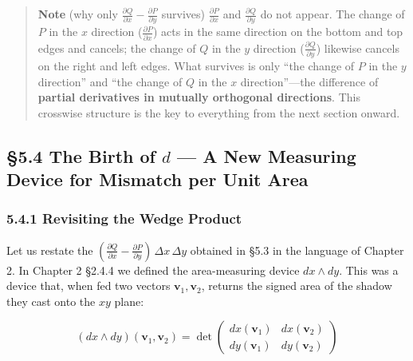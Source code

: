 \documentclass[a4paper,12pt,openany]{book}
\begin{document}
\begin{quote}
\textbf{Note} (why only
\(\frac{\partial Q}{\partial x}-\frac{\partial P}{\partial y}\)
survives) \(\frac{\partial P}{\partial x}\) and
\(\frac{\partial Q}{\partial y}\) do not appear. The change of \(P\) in
the \(x\) direction (\(\frac{\partial P}{\partial x}\)) acts in the same
direction on the bottom and top edges and cancels; the change of \(Q\)
in the \(y\) direction (\(\frac{\partial Q}{\partial y}\)) likewise
cancels on the right and left edges. What survives is only ``the change
of \(P\) in the \(y\) direction'' and ``the change of \(Q\) in the \(x\)
direction''—the difference of
\textbf{partial derivatives in mutually orthogonal directions}. This
crosswise structure is the key to everything from the next section
onward.
\end{quote}

\par\vspace{0.35em}\par

\hypertarget{the-birth-of-d-a-new-measuring-device-for-mismatch-per-unit-area}{%
\subsection{\texorpdfstring{§5.4 The Birth of \(d\) — A New Measuring
Device for Mismatch per Unit
Area}{§5.4 The Birth of d — A New Measuring Device for Mismatch per Unit Area}}\label{the-birth-of-d-a-new-measuring-device-for-mismatch-per-unit-area}}

\hypertarget{revisiting-the-wedge-product}{%
\subsubsection{5.4.1 Revisiting the Wedge
Product}\label{revisiting-the-wedge-product}}

Let us restate the
\((\frac{\partial Q}{\partial x} - \frac{\partial P}{\partial y})\,\Delta x\,\Delta y\)
obtained in §5.3 in the language of Chapter 2. In Chapter 2 §2.4.4 we
defined the area-measuring device \(dx \wedge dy\). This was a device
that, when fed two vectors \(\mathbf{v}_1, \mathbf{v}_2\), returns the
signed area of the shadow they cast onto the \(xy\) plane:

\[(dx \wedge dy)(\mathbf{v}_1, \mathbf{v}_2) = \det\begin{pmatrix} dx(\mathbf{v}_1) & dx(\mathbf{v}_2) \\ dy(\mathbf{v}_1) & dy(\mathbf{v}_2) \end{pmatrix}\]
\end{document}

